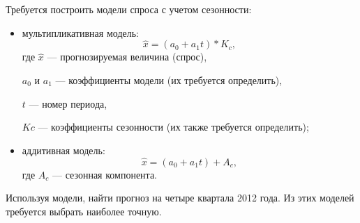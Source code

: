 Требуется построить модели спроса с учетом сезонности:
\begin{itemize}
\item мультипликативная модель:
  \begin{equation*}
    \hat{x} = (a_0 + a_1t)*K_c,
  \end{equation*}
  \hspace{1.5mm} где \( \hat{x} \) --- прогнозируемая величина (спрос), \par
  \( a_0 \) и \( a_1 \) --- коэффициенты модели (их требуется определить), \par
  \( t \) --- номер периода, \par
  \( Kc \) --- коэффициенты сезонности (их также требуется определить);
\item аддитивная модель:
  \begin{equation*}
    \hat{x} = (a_0 + a_1t)+A_c,
  \end{equation*}
  \hspace{1.5mm} где \( A_c \) --- сезонная компонента.
\end{itemize}

Используя модели, найти прогноз на четыре квартала 2012 года.
Из этих моделей требуется выбрать наиболее точную.
